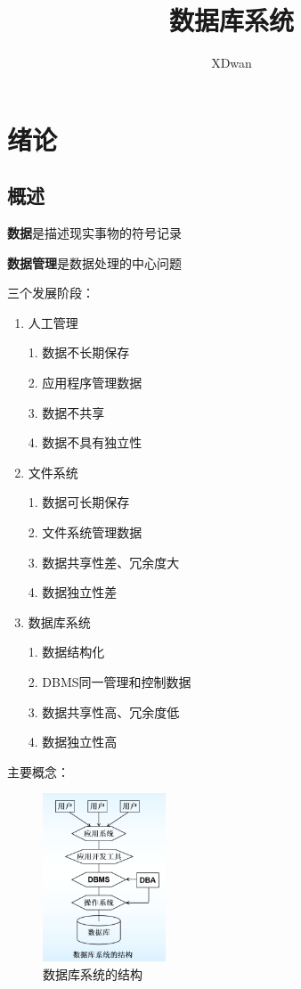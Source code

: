 \documentclass{article}
\title{数据库系统}
\author{XDwan}
\begin{document}
    

\section{绪论}

\subsection{概述}

\textbf{数据}是描述现实事物的符号记录

\textbf{数据管理}是数据处理的中心问题

三个发展阶段：

\begin{enumerate}
    \item 人工管理
    
    1. 数据不长期保存

    2. 应用程序管理数据

    3. 数据不共享


    4. 数据不具有独立性

    \item 文件系统
    
    1. 数据可长期保存

    2. 文件系统管理数据

    3. 数据共享性差、冗余度大

    4. 数据独立性差


    \item 数据库系统
    
    1. 数据结构化

    2. DBMS同一管理和控制数据

    3. 数据共享性高、冗余度低

    4. 数据独立性高

\end{enumerate}

主要概念：

\begin{figure}[H]
    \centering
    \includegraphics[height = 5cm]{img/1-1.png}
    \caption{数据库系统的结构}
\end{figure}
\end{document}
